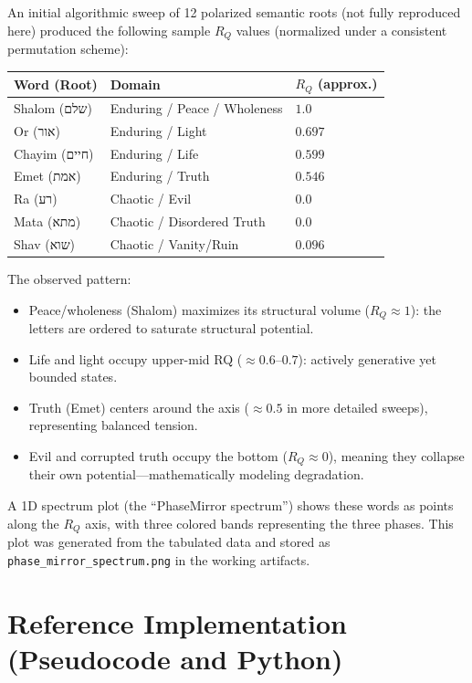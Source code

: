 \documentclass[11pt]{article}
\begin{document}
An initial algorithmic sweep of 12 polarized semantic roots (not fully reproduced here) produced the following sample $R_Q$ values (normalized under a consistent permutation scheme):

\begin{center}
\begin{tabular}{lll}
\toprule
Word (Root) & Domain & $R_Q$ (approx.) \\
\midrule
Shalom (שלם) & Enduring / Peace / Wholeness & $1.0$ \\
Or (אור) & Enduring / Light & $0.697$ \\
Chayim (חיים) & Enduring / Life & $0.599$ \\
Emet (אמת) & Enduring / Truth & $0.546$ \\
\midrule
Ra (רע) & Chaotic / Evil & $0.0$ \\
Mata (מתא) & Chaotic / Disordered Truth & $0.0$ \\
Shav (שוא) & Chaotic / Vanity/Ruin & $0.096$ \\
\bottomrule
\end{tabular}
\end{center}

The observed pattern:
\begin{itemize}
    \item Peace/wholeness (Shalom) maximizes its structural volume ($R_Q \approx 1$): the letters are ordered to saturate structural potential.
    \item Life and light occupy upper-mid RQ ($\approx 0.6$--$0.7$): actively generative yet bounded states.
    \item Truth (Emet) centers around the axis ($\approx 0.5$ in more detailed sweeps), representing balanced tension.
    \item Evil and corrupted truth occupy the bottom ($R_Q \approx 0$), meaning they collapse their own potential---mathematically modeling degradation.
\end{itemize}

A 1D spectrum plot (the ``PhaseMirror spectrum'') shows these words as points along the $R_Q$ axis, with three colored bands representing the three phases. This plot was generated from the tabulated data and stored as \texttt{phase\_mirror\_spectrum.png} in the working artifacts.\cite{semantictest}

\section{Reference Implementation (Pseudocode and Python)}
\end{document}
